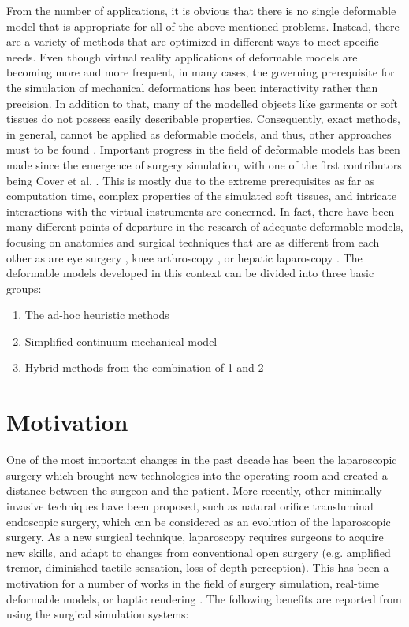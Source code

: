 From the number of applications, it is obvious that there is no single deformable model that is appropriate for all of the above mentioned 
problems. Instead, there are a variety of methods that are optimized in different ways to meet specific needs. Even though virtual reality 
applications of deformable models are becoming more and more frequent, in many cases, the governing prerequisite for the simulation of 
mechanical deformations has been interactivity rather than precision. In addition to that, many of the modelled objects like garments or soft 
tissues do not possess easily describable properties. Consequently, exact methods, in general, cannot be applied as deformable models, and thus, 
other approaches must to be found \cite{bro1998finite}. Important progress in the field of deformable models has been made since the emergence of surgery 
simulation, with one of the first contributors being Cover et al. \cite{cover1993interactively}. This is mostly due to the extreme prerequisites 
as far as computation time, complex properties of the simulated soft tissues, and intricate interactions with the virtual instruments are concerned. 
In fact, there have been many different points of departure in the research of adequate deformable models, focusing on anatomies and surgical techniques 
that are as different from each other as are eye surgery \cite{cai2001parametric, sagar1994virtual}, knee arthroscopy \cite{gibson1997simulating, 
hoffman1998commercially}, or hepatic laparoscopy \cite{cotin1999real}. The deformable models developed in this context can be divided into three basic groups: 

\begin{enumerate}
 \item The ad-hoc heuristic methods
 \item Simplified continuum-mechanical model
 \item Hybrid methods from the combination of 1 and 2
\end{enumerate}

\section{Motivation}
One of the most important changes in the past decade has been the laparoscopic surgery which brought new technologies into the operating room and created a 
distance between the surgeon and the patient. More recently, other minimally invasive techniques have been proposed, such as natural orifice transluminal 
endoscopic surgery, which can be considered as an evolution of the laparoscopic surgery. As a new surgical technique, laparoscopy requires surgeons to acquire 
new skills, and adapt to changes from conventional open surgery (e.g. amplified tremor, diminished tactile sensation, loss of depth perception). This has been 
a motivation for a number of works in the field of surgery simulation, real-time deformable models, or haptic rendering \cite{Lin2004}. The following benefits are reported
from using the surgical simulation systems:

